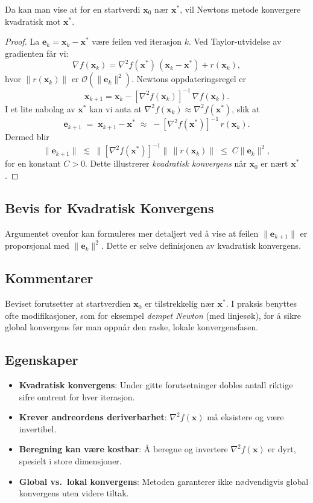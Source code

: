 Da kan man vise at for en startverdi \(\symbf{x}_0\) nær \(\symbf{x}^*\), vil Newtons metode konvergere kvadratisk mot \(\symbf{x}^*\).

\begin{proof}{}{}
  La \(\symbf{e}_k = \symbf{x}_k - \symbf{x}^*\) være feilen ved iterasjon \(k\). 
  Ved Taylor-utvidelse av gradienten får vi:
  \[
    \nabla f(\symbf{x}_k) 
    = \nabla^2 f(\symbf{x}^*)\,(\symbf{x}_k - \symbf{x}^*) + r(\symbf{x}_k),
  \]
  hvor \(\|r(\symbf{x}_k)\|\) er \(\mathcal{O}(\|\symbf{e}_k\|^2)\). Newtons oppdateringsregel er
  \[
    \symbf{x}_{k+1} 
    = \symbf{x}_k 
    - [\nabla^2 f(\symbf{x}_k)]^{-1}\,\nabla f(\symbf{x}_k).
  \]
  I et lite nabolag av \(\symbf{x}^*\) kan vi anta at 
  \(\nabla^2 f(\symbf{x}_k)\approx \nabla^2 f(\symbf{x}^*)\), slik at
  \[
    \symbf{e}_{k+1} 
    \;=\; \symbf{x}_{k+1} - \symbf{x}^* 
    \;\approx\;
    -[\nabla^2 f(\symbf{x}^*)]^{-1}\,r(\symbf{x}_k).
  \]
  Dermed blir
  \[
    \|\symbf{e}_{k+1}\|
    \;\lesssim\;
    \|[\nabla^2 f(\symbf{x}^*)]^{-1}\|\,
    \|r(\symbf{x}_k)\|
    \;\le\;
    C \|\symbf{e}_k\|^2,
  \]
  for en konstant \(C>0\). Dette illustrerer \textit{kvadratisk konvergens} når \(\symbf{x}_0\) er nært \(\symbf{x}^*\).
\end{proof}

\subsection{Bevis for Kvadratisk Konvergens}
\label{sec:newton_quadratic_convergence}
Argumentet ovenfor kan formuleres mer detaljert ved å vise at feilen \(\|\symbf{e}_{k+1}\|\) er proporsjonal med \(\|\symbf{e}_k\|^2\). Dette er selve definisjonen av kvadratisk konvergens.

\subsection{Kommentarer}
Beviset forutsetter at startverdien \(\symbf{x}_0\) er tilstrekkelig nær \(\symbf{x}^*\). I praksis benyttes ofte modifikasjoner, som for eksempel \textit{dempet Newton} (med linjesøk), for å sikre global konvergens før man oppnår den raske, lokale konvergensfasen.

\subsection{Egenskaper}
\begin{itemize}
  \item \textbf{Kvadratisk konvergens}: Under gitte forutsetninger dobles antall riktige sifre omtrent for hver iterasjon.
  \item \textbf{Krever andreordens deriverbarhet}: \(\nabla^2 f(\symbf{x})\) må eksistere og være invertibel.
  \item \textbf{Beregning kan være kostbar}: Å beregne og invertere \(\nabla^2 f(\symbf{x})\) er dyrt, spesielt i store dimensjoner.
  \item \textbf{Global vs.\ lokal konvergens}: Metoden garanterer ikke nødvendigvis global konvergens uten videre tiltak.
\end{itemize}


